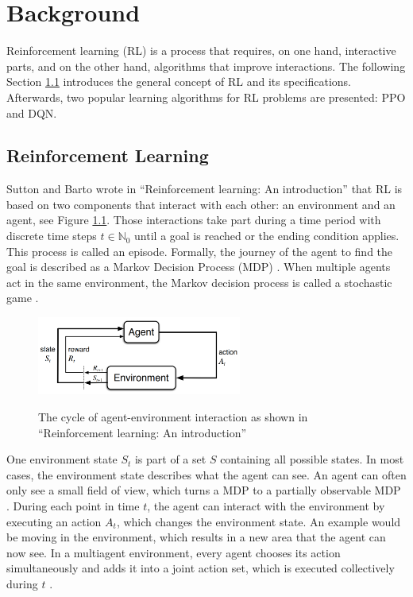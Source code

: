 \chapter{Background}\label{sec:Background}
Reinforcement learning (RL) is a process that requires, on one hand, interactive parts, and on the other hand, algorithms that improve interactions. The following Section \ref{reinforcement_learning} introduces the general concept of RL and its specifications. Afterwards, two popular learning algorithms for RL problems are presented: PPO and DQN.

\section{Reinforcement Learning}\label{reinforcement_learning}
Sutton and Barto wrote in ``Reinforcement learning: An introduction'' \cite{suba18} that RL is based on two components that interact with each other: an environment and an agent, see Figure \ref{fig:rl_cycle}. Those interactions take part during a time period with discrete time steps $t\in\mathbb{N}_0$ until a goal is reached or the ending condition applies. This process is called an episode. Formally, the journey of the agent to find the goal is described as a Markov Decision Process (MDP) \cite{suba18}. When multiple agents act in the same environment, the Markov decision process is called a stochastic game \cite{buba10}.

\begin{figure}[hpbt]
    \centering
    \includegraphics[width=0.6\textwidth]{pictures/RLInteractionSB}\\
    \caption[Reinforcement Learning Cycle]{The cycle of agent-environment interaction as
        shown in ``Reinforcement learning: An introduction'' \cite{suba18}}\label{fig:rl_cycle}
\end{figure}

One environment state $S_t$ is part of a set $S$ containing all possible states. In most cases, the environment state describes what the agent can see. An agent can often only see a small field of view, which turns a MDP to a partially observable MDP \cite{suba18}. During each point in time $t$, the agent can interact with the environment by executing an action $A_t$, which changes the environment state. An example would be moving in the environment, which results in a new area that the agent can now see. In a multiagent environment, every agent chooses its action simultaneously and adds it into a joint action set, which is executed collectively during $t$ \cite{buba10}.

